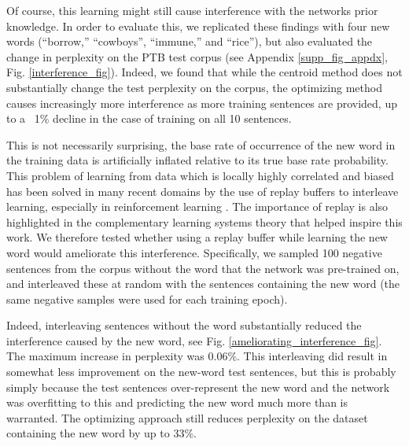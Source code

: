 \documentclass{article}
\begin{document}
Of course, this learning might still cause interference with the networks prior knowledge. In order to evaluate this, we replicated these findings with four new words (``borrow,'' ``cowboys'', ``immune,'' and ``rice''), but also evaluated the change in perplexity on the PTB test corpus (see Appendix \ref{supp_fig_appdx}, Fig. \ref{interference_fig}). Indeed, we found that while the centroid method does not substantially change the test perplexity on the corpus, the optimizing method causes increasingly more interference as more training sentences are provided, up to a ~1\% decline in the case of training on all 10 sentences. \par
This is not necessarily surprising, the base rate of occurrence of the new word in the training data is artificially inflated relative to its true base rate probability. This problem of learning from data which is locally highly correlated and biased has been solved in many recent domains by the use of replay buffers to interleave learning, especially in reinforcement learning \citep[e.g]{Mnih2015}. The importance of replay is also highlighted in the complementary learning systems theory \citep{Kumaran2016} that helped inspire this work. We therefore tested whether using a replay buffer while learning the new word would ameliorate this interference. Specifically, we sampled 100 negative sentences from the corpus without the word that the network was pre-trained on, and interleaved these at random with the sentences containing the new word (the same negative samples were used for each training epoch). \par
Indeed, interleaving sentences without the word substantially reduced the interference caused by the new word, see Fig. \ref{ameliorating_interference_fig}. The maximum increase in perplexity was \(0.06\%\). This interleaving did result in somewhat less improvement on the new-word test sentences, but this is probably simply because the test sentences over-represent the new word and the network was overfitting to this and predicting the new word much more than is warranted. The optimizing approach still reduces perplexity on the dataset containing the new word by up to 33\%. \par
\end{document}

